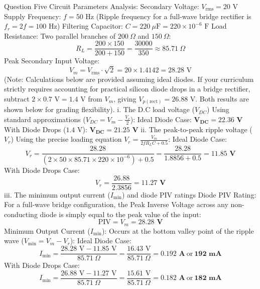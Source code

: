 Question Five
Circuit Parameters Analysis:
Secondary Voltage: $V_{\text{rms}} = 20\text{ V}$
Supply Frequency: $f = 50\text{ Hz}$ (Ripple frequency for a full-wave bridge rectifier is $f_r = 2f = 100\text{ Hz}$)
Filtering Capacitor: $C = 220\ \mu\text{F} = 220 \times 10^{-6}\text{ F}$
Load Resistance: Two parallel branches of $200\ \Omega$ and $150\ \Omega$:
$$R_L = \frac{200 \times 150}{200 + 150} = \frac{30000}{350} \approx 85.71\ \Omega$$ 
Peak Secondary Input Voltage:
$$V_m = V_{\text{rms}} \cdot \sqrt{2} = 20 \times 1.4142 = 28.28\text{ V}$$ 
(Note: Calculations below are provided assuming ideal diodes. 
If your curriculum strictly requires accounting for practical silicon diode drops in a bridge rectifier, 
subtract $2 \times 0.7\text{ V} = 1.4\text{ V}$ from $V_m$, giving $V_{p(\text{rect})} = 26.88\text{ V}$. 
Both results are shown below for grading flexibility).
i. The D.C load voltage ($V_{DC}$)
Using standard approximations ($V_{DC} = V_m - \frac{V_r}{2}$):
Ideal Diode Case: $\mathbf{V_{DC} = 22.36\text{ V}}$
With Diode Drops ($1.4\text{ V}$): $\mathbf{V_{DC} = 21.25\text{ V}}$
ii. The peak-to-peak ripple voltage ($V_r$)
Using the precise loading equation $V_r = \frac{V_m}{2f R_L C + 0.5}$:
Ideal Diode Case:
$$V_r = \frac{28.28}{(2 \times 50 \times 85.71 \times 220 \times 10^{-6}) + 0.5} = \frac{28.28}{1.8856 + 0.5} = \mathbf{11.85\text{ V}}$$ 
With Diode Drops Case:
$$V_r = \frac{26.88}{2.3856} = \mathbf{11.27\text{ V}}$$ 
iii. The minimum output current ($I_{\text{min}}$) and diode PIV ratings
Diode PIV Rating:
For a full-wave bridge configuration, the Peak Inverse Voltage across any non-conducting diode is simply equal to the peak value of the input:
$$\text{PIV} = V_m = \mathbf{28.28\text{ V}}$$ 
Minimum Output Current ($I_{\text{min}}$):
Occurs at the bottom valley point of the ripple wave ($V_{\text{min}} = V_m - V_r$):
Ideal Diode Case:
$$I_{\text{min}} = \frac{28.28\text{ V} - 11.85\text{ V}}{85.71\ \Omega} = \frac{16.43\text{ V}}{85.71\ \Omega} = \mathbf{0.192\text{ A}}\ \text{or}\ \mathbf{192\text{ mA}}$$ 
With Diode Drops Case:
$$I_{\text{min}} = \frac{26.88\text{ V} - 11.27\text{ V}}{85.71\ \Omega} = \frac{15.61\text{ V}}{85.71\ \Omega} = \mathbf{0.182\text{ A}}\ \text{or}\ \mathbf{182\text{ mA}}$$
